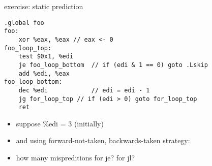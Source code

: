 \begin{frame}[fragile,label=staticPredictEx]{exercise: static prediction}
\begin{lstlisting}[language=myasm,style=smaller]
.global foo
foo:
    xor %eax, %eax // eax <- 0
foo_loop_top:
    test $0x1, %edi
    je foo_loop_bottom  // if (edi & 1 == 0) goto .Lskip
    add %edi, %eax 
foo_loop_bottom:
    dec %edi            // edi = edi - 1
    jg for_loop_top // if (edi > 0) goto for_loop_top
    ret
\end{lstlisting}
\begin{itemize}
\item suppose \%edi = 3 (initially)
\item and using forward-not-taken, backwards-taken strategy:
\item how many mispreditions for je? for jl?
\end{itemize}
\end{frame}

